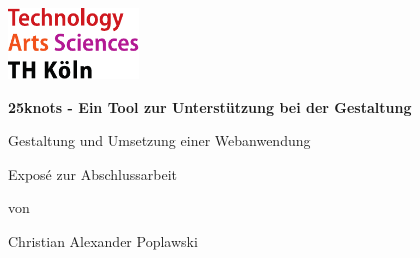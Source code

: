 \begin{titlepage}

\begin{center}

\includegraphics[width=0.26\textwidth]{images/THlogoheader.pdf}

\vspace{0.8cm}

\begin{rmfamily}
\begin{huge}
\textbf{25knots - Ein Tool zur Unterstützung bei der Gestaltung}\\
\end{huge}
\vspace{0.5cm}
\begin{LARGE}
Gestaltung und Umsetzung einer Webanwendung
\end{LARGE}
\end{rmfamily}

\vspace{1.6cm}



\begin{LARGE}
\begin{scshape}
Exposé zur Abschlussarbeit\\[0.8em]
\end{scshape}
\end{LARGE}

\begin{large}
von\\
\vspace{0.2cm}
\begin{LARGE}
Christian Alexander Poplawski\\
\end{LARGE}
\end{large}


\end{center}
\end{titlepage}
